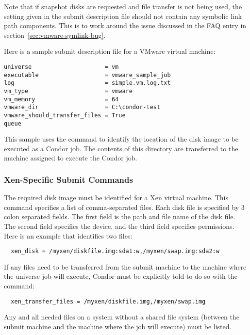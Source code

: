 Note that if snapshot disks are requested and file transfer is not
being used, the  setting given in 
the submit description file
should not contain any symbolic link path components.
This is to work around the issue discussed
in the FAQ entry in section~\ref{sec:vmware-symlink-bug}.

Here is a sample submit description file for a VMware virtual machine:
\begin{verbatim}
universe                     = vm
executable                   = vmware_sample_job
log                          = simple.vm.log.txt
vm_type                      = vmware
vm_memory                    = 64
vmware_dir                   = C:\condor-test
vmware_should_transfer_files = True
queue
\end{verbatim}
This sample uses the  command to identify
the location of the disk image to be executed as a Condor job.
The contents of this directory are transferred to the machine assigned
to execute the Condor job.

\subsubsection{\label{sec:vm-Xensubmitfile}Xen-Specific Submit Commands}

The required disk image must be identified for a Xen virtual machine.
This  command specifies a list of comma-separated files.
Each disk file is specified by 3 colon separated fields.
The first field is the path and file name of the disk file.
The second field specifies the device,
and the third field specifies permissions.
Here is an example that identifies two files:
\footnotesize
\begin{verbatim}
  xen_disk = /myxen/diskfile.img:sda1:w,/myxen/swap.img:sda2:w
\end{verbatim}
\normalsize

If any files need to be transferred from the submit machine
to the machine where the  universe job will execute, 
Condor must be explicitly told to do so with the 
 command:
\footnotesize
\begin{verbatim}
  xen_transfer_files = /myxen/diskfile.img,/myxen/swap.img
\end{verbatim}
\normalsize
Any and all needed files on a system without a shared file
system (between the submit machine and the machine where the
job will execute) must be listed.

